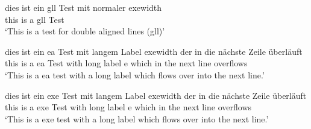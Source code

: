 \ea
 \gll dies ist ein gll Test mit normaler exewidth\\
      this is a gll Test\\
 \glt `This is a test for double aligned lines (gll)'
\z

\setcounter{xnumi}{123}
\setcounter{equation}{123}

\ea
 \gll dies ist ein ea Test mit langem Label exewidth der in die nächste Zeile überläuft\\
      this is a ea Test with long label e which in the next line overflows\\
 \glt `This is a ea test with a long label which flows over into the next line.'
\z

\begin{exe}
 \ex
 \gll dies ist ein exe Test mit langem Label exewidth der in die nächste Zeile überläuft\\
      this is a exe Test with long label e which in the next line overflows\\
 \glt `This is a exe test with a long label which flows over into the next line.'
\z
\end{exe}


\setcounter{equation}{16} 